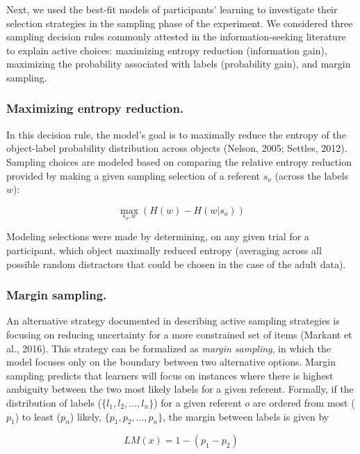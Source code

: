 \documentclass[10pt, letterpaper]{article}
\begin{document}
Next, we used the best-fit models of participants' learning to
investigate their selection strategies in the sampling phase of the
experiment. We considered three sampling decision rules commonly
attested in the information-seeking literature to explain active
choices: maximizing entropy reduction (information gain), maximizing the
probability associated with labels (probability gain), and margin
sampling.

\subsubsection{Maximizing entropy
reduction.}\label{maximizing-entropy-reduction.}

In this decision rule, the model's goal is to maximally reduce the
entropy of the object-label probability distribution across objects
(Nelson, 2005; Settles, 2012). Sampling choices are modeled based on
comparing the relative entropy reduction provided by making a given
sampling selection of a referent \(s_o\) (across the labels \(w\)):

\begin{equation}
\max_{s_o,w}({H(w)-H(w|s_o)})
\label{eq:entropy_reduction}
\end{equation}

Modeling selections were made by determining, on any given trial for a
participant, which object maximally reduced entropy (averaging across
all possible random distractors that could be chosen in the case of the
adult data).

\subsubsection{Margin sampling.}\label{margin-sampling.}

An alternative strategy documented in describing active sampling
strategies is focusing on reducing uncertainty for a more constrained
set of items (Markant et al., 2016). This strategy can be formalized as
\emph{margin sampling}, in which the model focuses only on the boundary
between two alternative options. Margin sampling predicts that learners
will focus on instances where there is highest ambiguity between the two
most likely labels for a given referent. Formally, if the distribution
of labels (\(\{l_1,l_2,...,l_n\}\)) for a given referent \(o\) are
ordered from most (\(p_1\)) to least (\(p_n\)) likely,
\(\{p_1,p_2,...,p_n\}\), the margin between labels is given by

\begin{equation}
LM(x) = 1 - (p_1 - p_2)
\label{eq:margin_sampling}
\end{equation}
\end{document}
